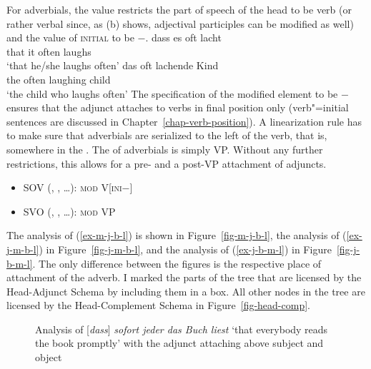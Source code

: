 \noindent
For  adverbials, the value restricts the part of speech of the head to be verb (or rather
verbal since, as (b) shows, adjectival participles can be modified as
well) and the value of \textsc{initial} to be $-$. 
\eal
\ex
\gll dass es oft lacht\\
     that it often laughs\\\german
\glt `that he/she laughs often'
\ex 
\gll das oft lachende Kind\\
     the often laughing child\\
\glt `the child who laughs often'
\zl
The specification of the modified element to be \initial{}$-$ ensures that the adjunct attaches to
verbs in final position only (verb"=initial sentences are discussed in
Chapter~\ref{chap-verb-position}). A linearization rule has to make sure that adverbials are
serialized to the left of the verb, that is, somewhere in the \mf. The \modv of  adverbials
is simply VP. Without any further restrictions, this allows for a pre- and a post-VP attachment of
adjuncts.
\begin{itemize}
\item SOV (, , \ldots): \textsc{mod} V[\textsc{ini}$-$]
\item SVO (, , \ldots): \textsc{mod} VP
\end{itemize}

\noindent
The analysis of (\ref{ex-m-j-b-l}) is shown in Figure~\vref{fig-m-j-b-l}, the analysis of
(\ref{ex-j-m-b-l}) in Figure~\vref{fig-j-m-b-l}, and the analysis of (\ref{ex-j-b-m-l}) in
Figure~\vref{fig-j-b-m-l}. The only difference between the figures is the respective place of
attachment of the adverb. I marked the parts of the tree that are licensed by the Head-Adjunct
Schema by including them in a box. All other nodes in the tree are licensed by the Head-Complement
Schema in Figure~\ref{fig-head-comp}.


\begin{figure}

\caption{\label{fig-m-j-b-l}Analysis of [\emph{dass}] \emph{sofort jeder das Buch liest} `that everybody reads the
  book promptly' with the adjunct attaching above subject and object}
\end{figure}


